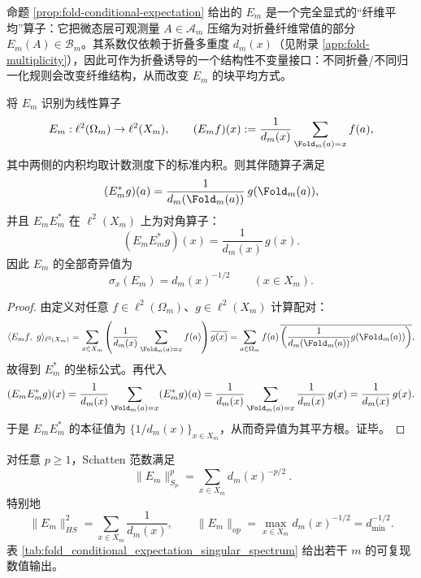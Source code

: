 \begin{remark}
\label{rem:fold-expectation-interface}
命题 \ref{prop:fold-conditional-expectation} 给出的 $E_m$ 是一个完全显式的“纤维平均”算子：它把微态层可观测量 $A\in\mathcal{A}_m$ 压缩为对折叠纤维常值的部分 $E_m(A)\in\mathcal{B}_m$。其系数仅依赖于折叠多重度 $d_m(x)$（见附录 \ref{app:fold-multiplicity}），因此可作为折叠诱导的一个结构性不变量接口：不同折叠/不同归一化规则会改变纤维结构，从而改变 $E_m$ 的块平均方式。
\end{remark}

\begin{proposition}\label{prop:fold-conditional-expectation-singular-spectrum}
将 $E_m$ 识别为线性算子
\[
E_m:\ell^2(\Omega_m)\to \ell^2(X_m),
\qquad
(E_m f)(x):=\frac{1}{d_m(x)}\sum_{\Fold_m(a)=x} f(a),
\]
其中两侧的内积均取计数测度下的标准内积。则其伴随算子满足
\[
(E_m^\ast g)(a)=\frac{1}{d_m(\Fold_m(a))}\,g(\Fold_m(a)),
\]
并且 \(E_mE_m^\ast\) 在 \(\ell^2(X_m)\) 上为对角算子：
\[
(E_mE_m^\ast g)(x)=\frac{1}{d_m(x)}\,g(x).
\]
因此 \(E_m\) 的全部奇异值为
\[
\boxed{\ \sigma_x(E_m)=d_m(x)^{-1/2}\qquad(x\in X_m).\ }
\]
\end{proposition}
\begin{proof}
由定义对任意 \(f\in\ell^2(\Omega_m)\)、\(g\in\ell^2(X_m)\) 计算配对：
\[
\langle E_m f,\ g\rangle_{\ell^2(X_m)}
=\sum_{x\in X_m}\left(\frac{1}{d_m(x)}\sum_{\Fold_m(a)=x} f(a)\right)\overline{g(x)}
=\sum_{a\in\Omega_m} f(a)\,\overline{\left(\frac{1}{d_m(\Fold_m(a))}g(\Fold_m(a))\right)},
\]
故得到 \(E_m^\ast\) 的坐标公式。再代入
\[
(E_mE_m^\ast g)(x)
=\frac{1}{d_m(x)}\sum_{\Fold_m(a)=x}(E_m^\ast g)(a)
=\frac{1}{d_m(x)}\sum_{\Fold_m(a)=x}\frac{1}{d_m(x)}\,g(x)
=\frac{1}{d_m(x)}\,g(x).
\]
于是 \(E_mE_m^\ast\) 的本征值为 \(\{1/d_m(x)\}_{x\in X_m}\)，从而奇异值为其平方根。证毕。
\end{proof}

\begin{corollary}\label{cor:fold-conditional-expectation-schatten}
对任意 \(p\ge 1\)，Schatten 范数满足
\[
\boxed{\ \|E_m\|_{S_p}^p=\sum_{x\in X_m} d_m(x)^{-p/2}\ }.
\]
特别地
\[
\|E_m\|_{HS}^2=\sum_{x\in X_m}\frac{1}{d_m(x)},
\qquad
\|E_m\|_{op}=\max_{x\in X_m} d_m(x)^{-1/2}=d_{\min}^{-1/2}.
\]
表 \ref{tab:fold_conditional_expectation_singular_spectrum} 给出若干 \(m\) 的可复现数值输出。

\end{corollary}


